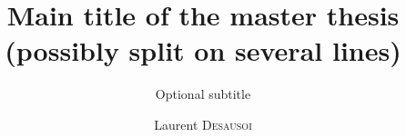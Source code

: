 \documentclass{EPL-master-thesis-covers-EN}
\title{Main title of the master thesis (possibly split on several lines)}
\subtitle{Optional subtitle}
\author{Laurent \textsc{Desausoi}}
\begin{document}
  \maketitle

  \backcoverpage
\end{document}
